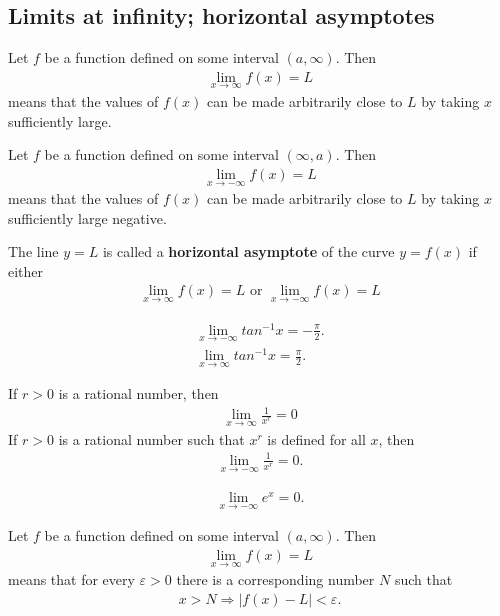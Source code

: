 \documentclass{article}
\begin{document}
\subsection{Limits at infinity; horizontal asymptotes}
\begin{definition}
	Let $f$ be a function defined on some interval $(a,\infty)$. Then
	\begin{align*}
		\lim_{x\to\infty}f(x)=L
	\end{align*}
	means that the values of $f(x)$ can be made arbitrarily close to $L$ by taking $x$ sufficiently large.
\end{definition}
\begin{definition}
	Let $f$ be a function defined on some interval $(\infty, a)$. Then
	\begin{align*}
		\lim_{x\to -\infty}f(x)=L
	\end{align*}
	means that the values of $f(x)$ can be made arbitrarily close to $L$ by taking $x$ sufficiently large negative.
\end{definition}
\begin{definition}
	The line $y=L$ is called a \textbf{horizontal asymptote} of the curve $y=f(x)$ if either
	\begin{align*}
		\lim_{x\to \infty}f(x)=L \text{ or } \lim_{x\to-\infty}f(x)=L
	\end{align*}
\end{definition}
\begin{theorem}
	\begin{align*}
		\lim_{x\to-\infty}tan^{-1}x=-\frac{\pi}{2}. \\
		\lim_{x\to\infty}tan^{-1}x=\frac{\pi}{2}.
	\end{align*}
\end{theorem}
\begin{theorem}
	If $r>0$ is a rational number, then
	\begin{align*}
		\lim_{x\to\infty}\frac{1}{x^r}=0
	\end{align*}
	If $r>0$ is a rational number such that $x^r$ is defined for all $x$, then
	\begin{align*}
		\lim_{x\to-\infty}\frac{1}{x^r}=0.
	\end{align*}
\end{theorem}
\begin{theorem}
	\begin{align*}
		\lim_{x\to-\infty}e^x=0.
	\end{align*}
\end{theorem}
\begin{definition}
	Let $f$ be a function defined on some interval $(a, \infty)$. Then
	\begin{align*}
		\lim_{x\to\infty}f(x)=L
	\end{align*}
	means that for every $\varepsilon>0$ there is a corresponding number $N$ such that
	\begin{align*}
		x>N\Rightarrow|f(x)-L|<\varepsilon.
	\end{align*}
\end{definition}
\end{document}
